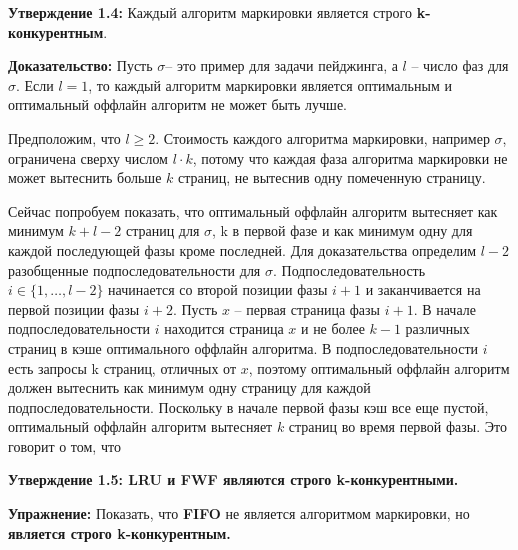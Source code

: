 
\textbf{Утверждение 1.4:} Каждый алгоритм маркировки является строго \textbf{k-конкурентным}.

\vspace{\baselineskip}

\textbf{Доказательство:} Пусть $\sigma$– это пример для задачи пейджинга, а $l$ – число фаз для $\sigma$. Если $l = 1$, то каждый алгоритм маркировки является оптимальным и оптимальный оффлайн алгоритм не может быть лучше.

Предположим, что $l \geqslant 2$. Стоимость каждого алгоритма маркировки, например $\sigma$, ограничена сверху числом $l \cdot k$, потому что каждая фаза алгоритма маркировки не может вытеснить больше $k$ страниц, не вытеснив одну помеченную страницу.

Сейчас попробуем показать, что оптимальный оффлайн алгоритм вытесняет как минимум $k+l-2$ страниц для $\sigma$, k в первой фазе и как минимум одну для каждой последующей фазы кроме последней. Для доказательства определим $l-2$ разобщенные подпоследовательности для $\sigma$. Подпоследовательность $i \in \{1,\dots,l-2\}$ начинается со второй позиции фазы $i+1$ и заканчивается на первой позиции фазы $i+2$. Пусть $x$ – первая страница фазы $i + 1$. В начале подпоследовательности $i$ находится страница $x$ и не более $k-1$ различных страниц в кэше оптимального оффлайн алгоритма. В подпоследовательности $i$ есть запросы k страниц, отличных от $x$, поэтому оптимальный оффлайн алгоритм должен вытеснить как минимум одну страницу для каждой подпоследовательности. Поскольку в начале первой фазы кэш все еще пустой, оптимальный оффлайн алгоритм вытесняет $k$ страниц во время первой фазы. Это говорит о том, что

\vspace{\baselineskip}


\vspace{\baselineskip}

\textbf{Утверждение 1.5: LRU и FWF являются строго k-конкурентными.}

\vspace{\baselineskip}

\textbf{Упражнение:} Показать, что \textbf{FIFO} не является алгоритмом маркировки, но \textbf{является строго k-конкурентным.}

\vspace{\baselineskip}

